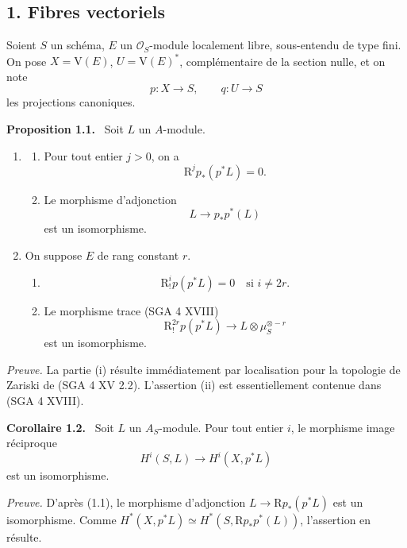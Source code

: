 \documentclass[11pt]{article}
\newenvironment{statement}[1]{\par\medskip\noindent\textbf{#1.}\ }{\par\medskip}
\newcommand{\R}{\mathrm{R}}\newcommand{\RHomCore}{\mathrm{RHom}}
\providecommand{\R}{\mathrm R}
\providecommand{\V}{\mathrm V}
\begin{document}
\subsection*{1. Fibres vectoriels}

Soient $S$ un schéma, $E$ un $\mathcal O_S$-module localement libre, sous-entendu de type fini. On pose $X=\V(E)$, $U=\V(E)^*$, complémentaire de la section nulle, et on note
\[
p:X\to S,
\qquad
q:U\to S
\]
les projections canoniques.

\begin{statement}{Proposition 1.1}
Soit $L$ un $A$-module.
\begin{enumerate}[label=(\roman*)]
\item
\begin{enumerate}[label=\alph*)]
\item Pour tout entier $j>0$, on a
\[
\R^j p_*(p^*L)=0.
\]
\item Le morphisme d'adjonction
\[
L\longrightarrow p_*p^*(L)
\]
est un isomorphisme.
\end{enumerate}
\item On suppose $E$ de rang constant $r$.
\begin{enumerate}[label=\alph*)]
\item
\[
\R_!^i p(p^*L)=0\quad\text{si }i\ne 2r.
\]
\item Le morphisme trace (SGA 4 XVIII)
\[
\R_!^{2r}p(p^*L)\longrightarrow L\otimes\mu_S^{\otimes -r}
\]
est un isomorphisme.
\end{enumerate}
\end{enumerate}
\end{statement}

\emph{Preuve.} La partie (i) résulte immédiatement par localisation pour la topologie de Zariski de (SGA 4 XV 2.2). L'assertion (ii) est essentiellement contenue dans (SGA 4 XVIII).

\begin{statement}{Corollaire 1.2}
Soit $L$ un $A_S$-module. Pour tout entier $i$, le morphisme image réciproque
\[
H^i(S,L)\longrightarrow H^i(X,p^*L)
\]
est un isomorphisme.
\end{statement}

\emph{Preuve.} D'après (1.1), le morphisme d'adjonction $L\to \R p_*(p^*L)$ est un isomorphisme. Comme $H^*(X,p^*L)\simeq H^*(S,\R p_*p^*(L))$, l'assertion en résulte.
\end{document}
